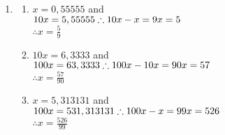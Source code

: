 \begin{solutions}{}
{\begin{enumerate}[itemsep=5pt, label=\textbf{\arabic*}. ]
\begin{multicols}{2}
\begin{enumerate}[itemsep=5pt, label=\textbf{(\alph*)} ]
\item \begin{array*} $1\frac{3}{11} &= 1 + 3\left(\frac{1}{11}\right) \\
        &= 1 + 3(0,090909\ldots)\\
&= 1 + 0,27272727\ldots \\
&= 1,\overline{27}$
       \end{array*}

\item \begin{array*} $
        4\frac{5}{6} &= 4 + 5\left(\frac{1}{6}\right) \\
&= 4+ 5(0,1666666\ldots) \\
&= 4 + 0,833333\ldots \\& = 4,8\dot{3}$
       \end{array*}

\item \begin{array*}$
        2\frac{1}{9} &= 2 + 0,1111111\ldots \\
&= 2,\dot{1}$
       \end{array*}

\end{enumerate}
\end{multicols}
\item %
\begin{multicols}{2}
\begin{enumerate}[itemsep=5pt, label=\textbf{(\alph*)} ] 
 \item \begin{array*}$        
x=0,55555$ and \\$10x = 5,55555 \\
\therefore 10x-x = 9x\\= 5$\\
 $\therefore x=\frac{5}{9}$
\end{array*}

\item  \begin{array*} $10x = 6,3333$ and\\ $100x= 63,3333 \\
        \therefore 100x-10x = 90x \\= 57$\\
 $\therefore x=\frac{57}{90}$
       \end{array*}

\item \begin{array*}
       $x = 5,313131$ and \\$100x=531,313131\\
 \therefore 100x-x=99x=\\526$ \\
$\therefore x=\frac{526}{99}$
      \end{array*}

\end{enumerate}
\end{multicols}
\end{enumerate}
}
\end{solutions}

